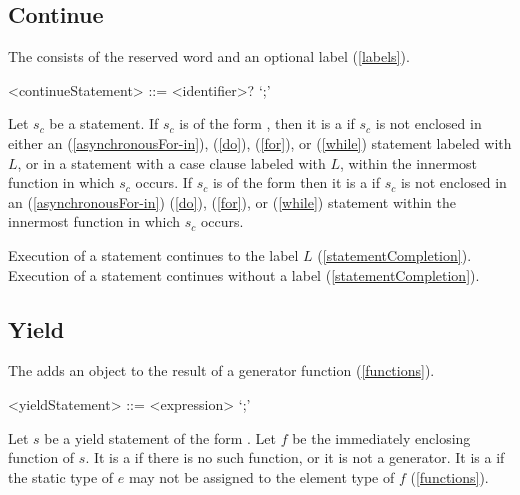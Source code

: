 \documentclass[makeidx]{article}
\begin{document}
\subsection{Continue}

\LMHash{}%
The  consists of the reserved word \CONTINUE{}
and an optional label (\ref{labels}).

\begin{grammar}
<continueStatement> ::= \CONTINUE{} <identifier>? `;'
\end{grammar}

\LMHash{}%
Let $s_c$ be a \CONTINUE{} statement.
If $s_c$ is of the form ,
then it is a  if $s_c$ is not enclosed in either an
\code{\AWAIT{} \FOR} (\ref{asynchronousFor-in}),
\DO{} (\ref{do}), \FOR{} (\ref{for}), or \WHILE{} (\ref{while})
statement labeled with $L$, or in a \SWITCH{} statement with a case clause
labeled with $L$, within the innermost function in which $s_c$ occurs.
If $s_c$ is of the form \code{\CONTINUE;}
then it is a  if $s_c$ is not enclosed in an
\code{\AWAIT{} \FOR} (\ref{asynchronousFor-in})
\DO{} (\ref{do}), \FOR{} (\ref{for}), or \WHILE{} (\ref{while}) statement
within the innermost function in which $s_c$ occurs.

\LMHash{}%
Execution of a \CONTINUE{} statement  continues
to the label $L$ (\ref{statementCompletion}).
Execution of a \CONTINUE{} statement \code{\CONTINUE;} continues
without a label (\ref{statementCompletion}).


\subsection{Yield}

\LMHash{}%
The  adds an object to
the result of a generator function
(\ref{functions}).

\begin{grammar}
<yieldStatement> ::= \YIELD{} <expression> `;'
\end{grammar}

\LMHash{}%
Let $s$ be a yield statement of the form .
Let $f$ be the immediately enclosing function of $s$.
It is a  if there is no such function,
or it is not a generator.
It is a  if the static type of $e$
may not be assigned to the element type of $f$
(\ref{functions}).
\end{document}
